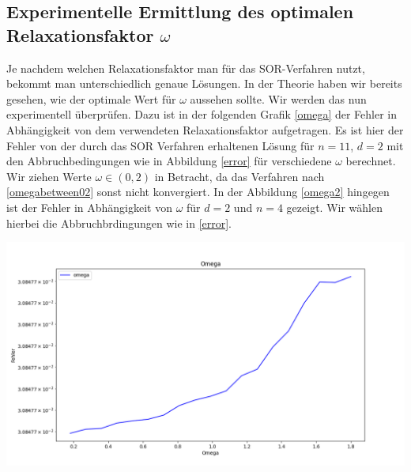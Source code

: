 \documentclass[smallheadings]{scrartcl}
\theoremstyle{definition}
\begin{document}
\subsection{Experimentelle Ermittlung des optimalen Relaxationsfaktor $\omega$}
Je nachdem welchen Relaxationsfaktor man für das SOR-Verfahren nutzt,  bekommt man unterschiedlich genaue Lösungen.  In der Theorie haben wir bereits gesehen, wie der optimale Wert für $\omega$ aussehen sollte.  Wir werden das nun experimentell überprüfen.  Dazu ist in der folgenden Grafik \ref{omega}
 der Fehler in Abhängigkeit von dem verwendeten Relaxationsfaktor aufgetragen.  Es ist hier der Fehler von der durch das SOR Verfahren erhaltenen Lösung für $n=11$, $d=2$ mit den Abbruchbedingungen wie in Abbildung \ref{error} für verschiedene $\omega$ berechnet. Wir ziehen Werte $\omega \in (0,2)$ in Betracht, da das Verfahren nach \ref{omegabetween02} sonst nicht konvergiert. In der Abbildung \ref{omega2} hingegen ist der Fehler in Abhängigkeit von $\omega$ für $d=2$ und $n=4$ gezeigt. Wir wählen hierbei die Abbruchbrdingungen wie in \ref{error}. 

\begin{minipage}{\textwidth}

 \centering
 \includegraphics[scale = 0.5]{Omega1}
 	\label{omega}

 \end{minipage}
 
\end{document}
